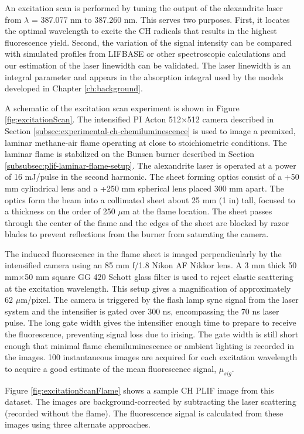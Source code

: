An excitation scan is performed by tuning the output of the alexandrite laser from \(\lambda\) = 387.077 nm to 387.260 nm.
This serves two purposes.
First, it locates the optimal wavelength to excite the CH radicals that results in the highest fluorescence yield.
Second, the variation of the signal intensity can be compared with simulated profiles from LIFBASE or other spectroscopic calculations and our estimation of the laser linewidth can be validated.
The laser linewidth is an integral parameter and appears in the absorption integral used by the models developed in Chapter \ref{ch:background}.

A schematic of the excitation scan experiment is shown in Figure \ref{fig:excitationScan}.
The intensified PI Acton 512\(\times\)512 camera described in Section \ref{subsec:experimental-ch-chemiluminescence} is used to image a premixed, laminar methane-air flame operating at close to stoichiometric conditions.
The laminar flame is stabilized on the Bunsen burner described in Section \ref{subsubsec:plif-laminar-flame-setup}.
The alexandrite laser is operated at a power of 16 mJ/pulse in the second harmonic.
The sheet forming optics consist of a +50 mm cylindrical lens and a +250 mm spherical lens placed 300 mm apart.
The optics form the beam into a collimated sheet about 25 mm (1 in) tall, focused to a thickness on the order of 250 \(\mu\)m at the flame location.
The sheet passes through the center of the flame and the edges of the sheet are blocked by razor blades to prevent reflections from the burner from saturating the camera.

The induced fluorescence in the flame sheet is imaged perpendicularly by the intensified camera using an 85 mm f/1.8 Nikon AF Nikkor lens.
A 3 mm thick 50 mm\(\times\)50 mm square GG 420 Schott glass filter is used to reject elastic scattering at the excitation wavelength.
This setup gives a magnification of approximately 62 \(\mu\)m/pixel.
The camera is triggered by the flash lamp sync signal from the laser system and the intensifier is gated over 300 ns, encompassing the 70 ns laser pulse.
The long gate width gives the intensifier enough time to prepare to receive the fluorescence, preventing signal loss due to irising.
The gate width is still short enough that minimal flame chemiluminescence or ambient lighting is recorded in the images.
100 instantaneous images are acquired for each excitation wavelength to acquire a good estimate of the mean fluorescence signal, \(\mu_{sig}\).

Figure \ref{fig:excitationScanFlame} shows a sample CH PLIF image from this dataset.
The images are background-corrected by subtracting the laser scattering (recorded without the flame).
The fluorescence signal is calculated from these images using three alternate approaches.

